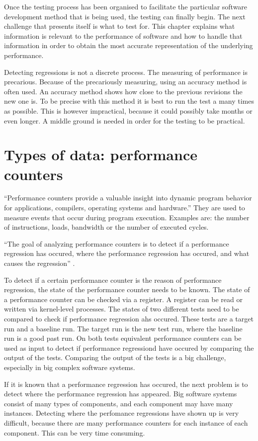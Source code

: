Once the testing process has been organised to facilitate the particular software development method that is being used, the testing can finally begin. The next challenge that presents itself is what to test for. This chapter explains what information is relevant to the performance of software and how to handle that information in order to obtain the most accurate representation of the underlying performance.

Detecting regressions is not a discrete process. The measuring of performance is precarious. Because of the precariously measuring, using an accuracy method is often used. An accuracy method shows how close to the previous revisions the new one is. To be precise with this method it is best to run the test a many times as possible. This is however impractical, because it could possibly take months or even longer. A middle ground is needed in order for the testing to be practical.

\section{Types of data: performance counters}
``Performance counters provide a valuable insight into dynamic program behavior for applications, compilers, operating systems and hardware.''\cite{zagha1996performance}
They are used to measure events that occur during program execution. Examples are: the number of instructions, loads, bandwidth or the number of executed cycles.

``The goal of analyzing performance counters is to detect if a performance regression has occured, where the performance regression has occured, and what causes the regression'' \cite{nguyen2012using}.

To detect if a certain performance counter is the reason of performance regression, the state of the performance counter needs to be known. The state of a performance counter can be checked via a register. A register can be read or written via kernel-level processes. The states of two different tests need to be compared to check if performance regression ahs occured. These tests are a target run and a baseline run. The target run is the new test run, where the baseline run is a good past run. On both tests equivalent performance counters can be used as input to detect if performance regressiond have occured by comparing the output of the tests. Comparing the output of the tests is a big challenge, especially in big complex software systems.

If it is known that a performance regression has occured, the next problem is to detect where the performance regression has appeared. Big software systems consist of many types of components, and each component may have many instances. Detecting where the perfomance regressions have shown up is very difficult, because there are many performance counters for each instance of each component. This can be very time consuming.

